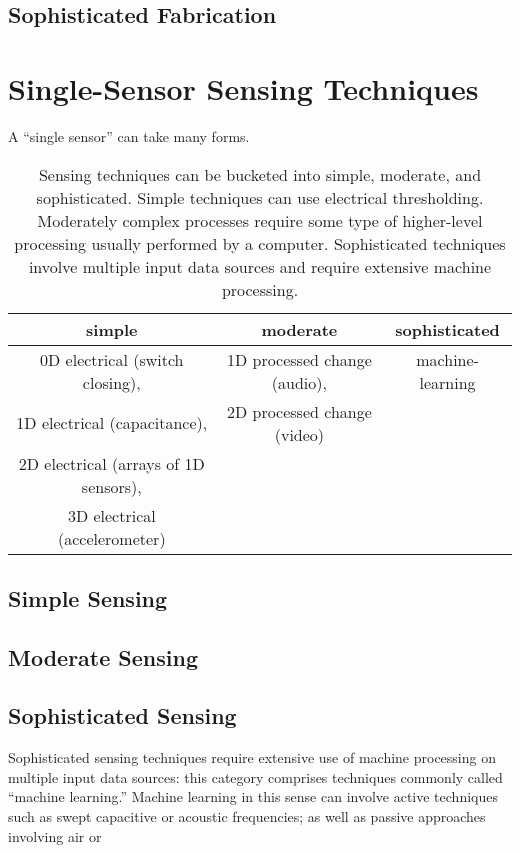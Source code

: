 \subsection{Sophisticated Fabrication}

\section{Single-Sensor Sensing Techniques}

A ``single sensor'' can take many forms.

\begin{table}
\begin{center}
\begin{tabular}{|c|c|c|}
\hline
\textbf{simple} & \textbf{moderate} & \textbf{sophisticated} \\
\hline
0D electrical (switch closing), & 1D processed change (audio), & machine-learning \\
1D electrical (capacitance), & 2D processed change (video) & \\
2D electrical (arrays of 1D sensors), & & \\
3D electrical (accelerometer) & & \\
\hline
\end{tabular}
\end{center}
\caption{Sensing techniques can be bucketed into simple, moderate, and sophisticated. Simple techniques can use electrical thresholding. Moderately complex processes require some type of higher-level processing usually performed by a computer. Sophisticated techniques involve multiple input data sources and require extensive machine processing.}
\label{table:sensing}
\end{table}

\subsection{Simple Sensing}

\subsection{Moderate Sensing}

\subsection{Sophisticated Sensing}

Sophisticated sensing techniques require extensive use of machine processing on multiple input data sources: this category comprises techniques commonly called ``machine learning.'' Machine learning in this sense can involve active techniques such as swept capacitive \cite{sato-touche} or acoustic \cite{ono-touchandactivate,laput-acoustruments} frequencies; as well as passive approaches involving air \cite{squeezapulse?} or 
